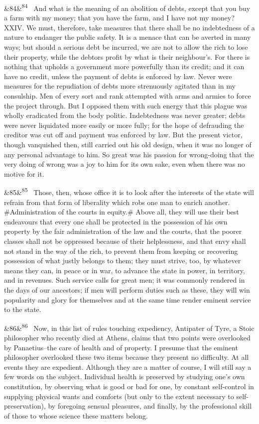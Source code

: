 \documentclass[12pt]{article}
\newcommand{\para}[1][]{\par\noindent\ifx&#1&\else\textsuperscript{\footnotesize #1}~\fi}
\begin{document}
\para[84] And what is the meaning of an abolition of debts, except that you buy a farm with my money; that you have the farm, and I have not my money? XXIV. We must, therefore, take measures that there shall be no indebtedness of a nature to endanger the public safety. It is a menace that can be averted in many ways; but should a serious debt be incurred, we are not to allow the rich to lose their property, while the debtors profit by what is their neighbour's. For there is nothing that upholds a government more powerfully than its credit; and it can have no credit, unless the payment of debts is enforced by law. Never were measures for the repudiation of debts more strenuously agitated than in my consulship. Men of every sort and rank attempted with arms and armies to force the project through. But I opposed them with such energy that this plague was wholly eradicated from the body politic. Indebtedness was never greater; debts were never liquidated more easily or more fully; for the hope of defrauding the creditor was cut off and payment was enforced by law. But the present victor, though vanquished then, still carried out his old design, when it was no longer of any personal advantage to him. So great was his passion for wrong-doing that the very doing of wrong was a joy to him for its own sake, even when there was no motive for it.

\para[85] Those, then, whose office it is to look after the interests of the state will refrain from that form of liberality which robs one man to enrich another. \#Administration of the courts in equity.\# Above all, they will use their best endeavours that every one shall be protected in the possession of his own property by the fair administration of the law and the courts, that the poorer classes shall not be oppressed because of their helplessness, and that envy shall not stand in the way of the rich, to prevent them from keeping or recovering possession of what justly belongs to them; they must strive, too, by whatever means they can, in peace or in war, to advance the state in power, in territory, and in revenues. Such service calls for great men; it was commonly rendered in the days of our ancestors; if men will perform duties such as these, they will win popularity and glory for themselves and at the same time render eminent service to the state.

\para[86] Now, in this list of rules touching expediency, Antipater of Tyre, a Stoic philosopher who recently died at Athens, claims that two points were overlooked by Panaetius--the care of health and of property. I presume that the eminent philosopher overlooked these two items because they present no difficulty. At all events they are expedient. Although they are a matter of course, I will still say a few words on the subject. Individual health is preserved by studying one's own constitution, by observing what is good or bad for one, by constant self-control in supplying physical wants and comforts (but only to the extent necessary to self-preservation), by foregoing sensual pleasures, and finally, by the professional skill of those to whose science these matters belong.
\end{document}
